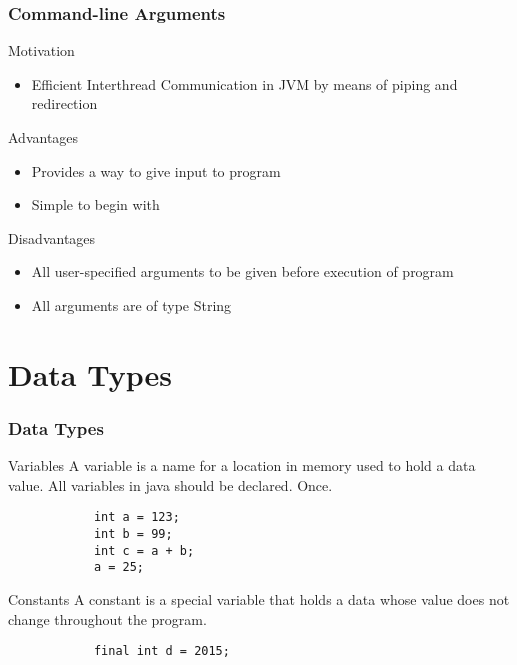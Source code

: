 \documentclass[10pt, compress]{beamer}
\begin{document}
\begin{frame}[fragile]
	\frametitle{Command-line Arguments}
	\begin{block}{Motivation}
		\begin{itemize}
			\item[] Efficient Interthread Communication in JVM by means of piping and redirection
		\end{itemize}
	\end{block}
	\begin{block}{Advantages}
		\begin{itemize}
			\item[] Provides a way to give input to program
			\item[] Simple to begin with
		\end{itemize}
	\end{block}
	\begin{block}{Disadvantages}
		\begin{itemize}
			\item[] All user-specified arguments to be given before execution of program
			\item[] All arguments are of type String
		\end{itemize}
	\end{block}
\end{frame}

\section{Data Types}

\begin{frame}[fragile]
	\frametitle{Data Types}
	\begin{block}{Variables}
		A variable is a name for a location in memory used to hold a data value. All variables in java should be declared. Once.
		\begin{verbatim}
			int a = 123;
			int b = 99;
			int c = a + b;
			a = 25;
		\end{verbatim}
	\end{block}
	\begin{block}{Constants}
		A constant is a special variable that holds a data whose value does not change throughout the program.
		\begin{verbatim}
			final int d = 2015;
		\end{verbatim}
	\end{block}
\end{frame}
\end{document}
